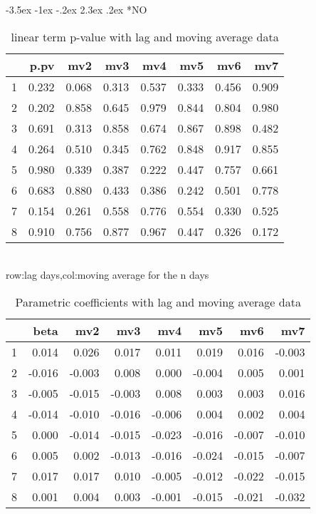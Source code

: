 \documentclass[a4paper, 12pt]{article}
\makeatletter
\def\large{\fontsize{14}{20}\selectfont}
\renewcommand\subsection{\@startsection {subsection}{1}{\z@}%
                                   {-3.5ex \@plus -1ex \@minus -.2ex}%
                                   {2.3ex \@plus.2ex}%
                                   {\centering\normalfont\large\bfseries}}
\makeatother
\begin{document}
\subsection*{NO}
\begin{table}[h]
\centering
\caption{linear term p-value with lag and moving average data}
\begin{tabular}{rrrrrrrr}
  \hline
 & p.pv & mv2 & mv3 & mv4 & mv5 & mv6 & mv7 \\
  \hline
1 & 0.232 & 0.068 & 0.313 & 0.537 & 0.333 & 0.456 & 0.909 \\
  2 & 0.202 & 0.858 & 0.645 & 0.979 & 0.844 & 0.804 & 0.980 \\
  3 & 0.691 & 0.313 & 0.858 & 0.674 & 0.867 & 0.898 & 0.482 \\
  4 & 0.264 & 0.510 & 0.345 & 0.762 & 0.848 & 0.917 & 0.855 \\
  5 & 0.980 & 0.339 & 0.387 & 0.222 & 0.447 & 0.757 & 0.661 \\
  6 & 0.683 & 0.880 & 0.433 & 0.386 & 0.242 & 0.501 & 0.778 \\
  7 & 0.154 & 0.261 & 0.558 & 0.776 & 0.554 & 0.330 & 0.525 \\
  8 & 0.910 & 0.756 & 0.877 & 0.967 & 0.447 & 0.326 & 0.172 \\
   \hline
\end{tabular}
\\row:lag days,col:moving average for the n days
\end{table}

\begin{table}[h]
\centering
\caption{Parametric coefficients with lag and moving average data}
\begin{tabular}{rrrrrrrr}
  \hline
 & beta & mv2 & mv3 & mv4 & mv5 & mv6 & mv7 \\
  \hline
1 & 0.014 & 0.026 & 0.017 & 0.011 & 0.019 & 0.016 & -0.003 \\
  2 & -0.016 & -0.003 & 0.008 & 0.000 & -0.004 & 0.005 & 0.001 \\
  3 & -0.005 & -0.015 & -0.003 & 0.008 & 0.003 & 0.003 & 0.016 \\
  4 & -0.014 & -0.010 & -0.016 & -0.006 & 0.004 & 0.002 & 0.004 \\
  5 & 0.000 & -0.014 & -0.015 & -0.023 & -0.016 & -0.007 & -0.010 \\
  6 & 0.005 & 0.002 & -0.013 & -0.016 & -0.024 & -0.015 & -0.007 \\
  7 & 0.017 & 0.017 & 0.010 & -0.005 & -0.012 & -0.022 & -0.015 \\
  8 & 0.001 & 0.004 & 0.003 & -0.001 & -0.015 & -0.021 & -0.032 \\
   \hline
\end{tabular}
\end{table}
\clearpage
\end{document}
